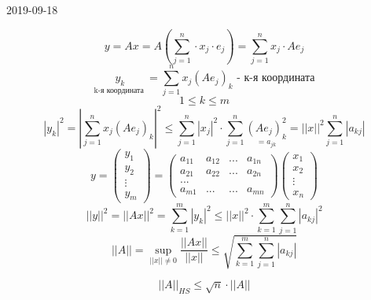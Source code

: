 \documentclass[main]{subfiles}
\begin{document}
\begin{lect}{2019-09-18}
		\begin{Proof}
				\[y = Ax = A(\sum_{j = 1}^n \cdot x_j \cdot e_j) = \sum^n_{j = 1} x_j \cdot Ae_j \]
				\[\underset{\text{k-я координата }}{y_k} = \sum^n_{j = 1}x_j(Ae_j)_k \text{ - к-я координата} \]
				\[1 \leq k \leq m\]
					\[|y_k|^2 = |\sum^n_{j = 1} x_j (Ae_j)_k|^2 \leq \sum_{j = 1}^n |x_j|^2 \cdot
				\sum^n_{j=1} \underset{= a_{jk} }{(Ae_j)_k^2} = ||x||^2 \sum^n_{j = 1} |a_{kj}| \]
				\[y = \begin{pmatrix}
					y_1\\
					y_2\\
					\vdots\\
					y_m
				\end{pmatrix}
				= \begin{pmatrix}
					a_{11} & a_{12} & ... & a_{1n}\\
					a_{21} & a_{22} & ... & a_{2n}\\
					...\\
					a_{m1} & ...    & ... & a_{mn}
				\end{pmatrix}
				\begin{pmatrix}
					x_1\\
					x_2\\
					\vdots\\
					x_n
				\end{pmatrix}
				\]
				\[||y||^2 = ||Ax||^2 = \sum^m_{k = 1}|y_k|^2 \leq ||x||^2 \cdot \sum^m_{k = 1}\sum^n_{j = 1} |a_{kj}|^2\]
				\[||A|| = \sup_{||x|| \neq 0} \frac{||Ax||}{||x||} \leq \sqrt{\sum^m_{k = 1} \sum^n_{j = 1} |a_{kj}| }\]
		\end{Proof}

		\begin{Upr}
				\[||A||_{HS} \leq \sqrt{n} \cdot ||A||\]
		\end{Upr}


\end{lect}
\end{document}
